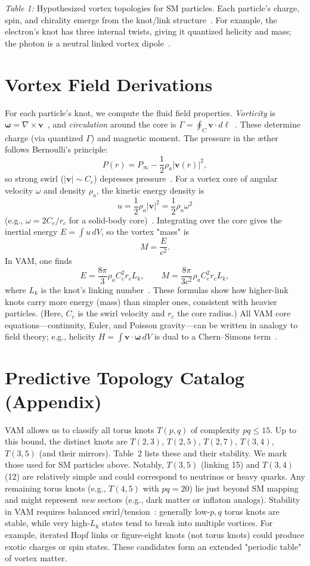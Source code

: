 \documentclass[a4paper,12pt]{article}
\begin{document}
\textit{Table 1:} Hypothesized vortex topologies for SM particles. Each particle's charge, spin, and chirality emerge from the knot/link structure~\cite{vam-lagrangian}. For example, the electron's knot has three internal twists, giving it quantized helicity and mass; the photon is a neutral linked vortex dipole~\cite{vam-lagrangian}.

\section*{Vortex Field Derivations}
For each particle's knot, we compute the fluid field properties. \textit{Vorticity} is $\boldsymbol{\omega} = \nabla \times \mathbf{v}$~\cite{helicity-appendix}, and \textit{circulation} around the core is $\Gamma = \oint_C \mathbf{v} \cdot d\boldsymbol{\ell}$~\cite{helicity-appendix}. These determine charge (via quantized $\Gamma$) and magnetic moment. The pressure in the æther follows Bernoulli's principle:
\[
P(r) = P_\infty - \frac{1}{2} \rho_a |\mathbf{v}(r)|^2,
\]
so strong swirl ($|\mathbf{v}| \sim C_e$) depresses pressure~\cite{vam-lagrangian}. For a vortex core of angular velocity $\omega$ and density $\rho_a$, the kinetic energy density is
\[
u = \frac{1}{2} \rho_a |\mathbf{v}|^2 = \frac{1}{2} \rho_a \omega^2
\]
(e.g., $\omega = 2C_e/r_c$ for a solid-body core)~\cite{mass-appendix}. Integrating over the core gives the inertial energy $E = \int u\,dV$, so the vortex "mass" is
\[
M = \frac{E}{c^2}.
\]
In VAM, one finds
\[
E = \frac{8\pi}{3} \rho_a C_e^2 r_c L_k, \qquad M = \frac{8\pi}{3c^2} \rho_a C_e^2 r_c L_k,
\]
where $L_k$ is the knot's linking number~\cite{mass-appendix,vam-lagrangian}. These formulas show how higher-link knots carry more energy (mass) than simpler ones, consistent with heavier particles. (Here, $C_e$ is the swirl velocity and $r_c$ the core radius.) All VAM core equations---continuity, Euler, and Poisson gravity---can be written in analogy to field theory; e.g., helicity $H = \int \mathbf{v} \cdot \boldsymbol{\omega}\,dV$ is dual to a Chern--Simons term~\cite{helicity-appendix}.

\section*{Predictive Topology Catalog (Appendix)}
VAM allows us to classify all torus knots $T(p,q)$ of complexity $pq \leq 15$. Up to this bound, the distinct knots are $T(2,3)$, $T(2,5)$, $T(2,7)$, $T(3,4)$, $T(3,5)$ (and their mirrors). Table~2 lists these and their stability. We mark those used for SM particles above. Notably, $T(3,5)$ (linking 15) and $T(3,4)$ (12) are relatively simple and could correspond to neutrinos or heavy quarks. Any remaining torus knots (e.g., $T(4,5)$ with $pq=20$) lie just beyond SM mapping and might represent \textit{new} sectors (e.g., dark matter or inflaton analogs). Stability in VAM requires balanced swirl/tension~\cite{mass-appendix,vam-lagrangian}: generally low-$p,q$ torus knots are stable, while very high-$L_k$ states tend to break into multiple vortices. For example, iterated Hopf links or figure-eight knots (not torus knots) could produce exotic charges or spin states. These candidates form an extended "periodic table" of vortex matter.
\end{document}
